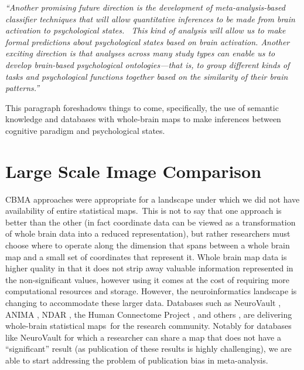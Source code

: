 \documentclass{report}
\begin{document}
\textit{``Another promising future direction is the development of
meta-analysis-based classifier techniques that will allow quantitative
inferences to be made from brain activation to psychological states.
~This kind of analysis will allow us to make formal predictions about
psychological states based on brain activation. Another exciting
direction is that analyses across many study types can enable us to
develop brain-based psychological ontologies---that is, to group
different kinds of tasks and psychological functions together based on
the similarity of their brain patterns.''}

This paragraph foreshadows things to come, specifically, the use of
semantic knowledge and databases with whole-brain maps to make
inferences between cognitive paradigm and psychological states.

\section{Large Scale Image Comparison}

CBMA approaches were appropriate for a landscape under which we did not
have availability of entire statistical maps.~This is not to say that
one approach is better than the other (in fact coordinate data can be
viewed as a transformation of whole brain data into a reduced
representation), but rather researchers must choose where to operate
along the dimension that spans between a whole brain map and a small set
of coordinates that represent it. Whole brain map data is higher quality
in that it does not strip away valuable information represented in the
non-significant values, however using it comes at the cost of requiring
more computational resources and storage. However, the neuroinformatics
landscape is changing to accommodate these larger data. Databases such
as NeuroVault \cite{Gorgolewski2015-gu}, ANIMA \cite{Reid2015-gt},
NDAR \cite{Hall2012-qo}, the Human Connectome Project \cite{Van_Essen2013-fi},
and others \cite{Book2016-ro,Landis2016-wo}, are delivering whole-brain
statistical maps~for the research community. Notably for databases like
NeuroVault for which a researcher can share a map that does not have a
``significant'' result (as publication of these results is highly
challenging), we are able to start addressing the problem of publication
bias in meta-analysis.
\end{document}
